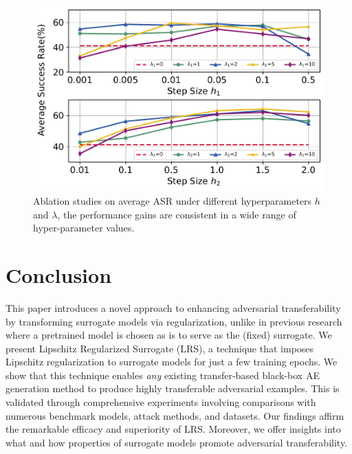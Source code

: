 \documentclass[letterpaper]{article} %
\theoremstyle{plain}
\theoremstyle{definition}
\begin{document}
\begin{figure}[h!]
    \centering
    \includegraphics[width=\linewidth]{figs/ablation.pdf}%
    \caption{Ablation studies on average ASR under different hyperparameters $h$ and $\lambda$, the performance gains are consistent in a wide range of hyper-parameter values.}
    \label{fig:ablation}%
\end{figure}

\section{Conclusion}  \label{sec:conclusion}
This paper introduces a novel approach to enhancing adversarial transferability by transforming surrogate models via regularization, unlike in previous research where a pretrained model is chosen as is to serve as the (fixed) surrogate. We present Lipschitz Regularized Surrogate (LRS), a technique that imposes Lipschitz regularization to surrogate models for just a few training epochs. We show that this technique enables {\em any} existing transfer-based black-box AE generation method to produce highly transferable adversarial examples. This is validated through comprehensive experiments involving comparisons with numerous benchmark models, attack methods, and datasets. Our findings affirm the remarkable efficacy and superiority of LRS. Moreover, we offer insights into what and how properties of surrogate models promote adversarial transferability.
\end{document}
